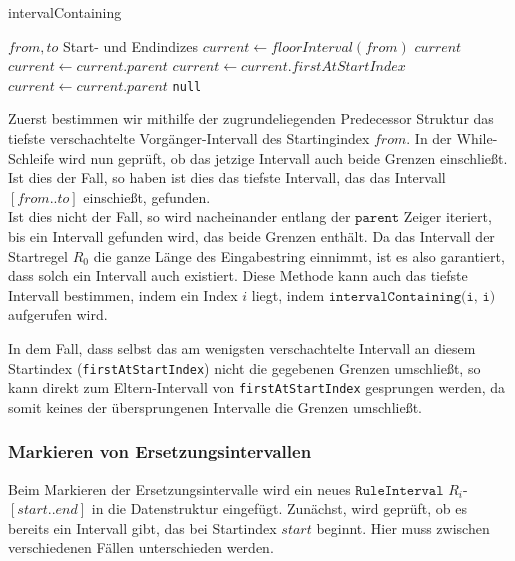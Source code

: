 \begin{algorithm}
	\caption{intervalContaining}
	\begin{algorithmic}
		\REQUIRE $from, to$ Start- und Endindizes
		\STATE $current \leftarrow floorInterval(from)$
				\RETURN $current$
			\ENDIF
                \STATE $current \leftarrow current.parent$
            \ELSE 
                \STATE $current \leftarrow current.firstAtStartIndex$
                    \STATE $current \leftarrow current.parent$
                \ENDIF
            \ENDIF
		\ENDWHILE
		\RETURN \texttt{null}
	\end{algorithmic}
\end{algorithm}

Zuerst bestimmen wir mithilfe der zugrundeliegenden Predecessor Struktur das tiefste verschachtelte Vorgänger-Intervall des Startingindex $from$. 
In der While-Schleife wird nun geprüft, ob das jetzige Intervall auch beide Grenzen einschließt. Ist dies der Fall, so haben ist dies das tiefste Intervall, das das Intervall $[from..to]$ einschießt, gefunden.\\
Ist dies nicht der Fall, so wird nacheinander entlang der $\texttt{parent}$ Zeiger iteriert, bis ein Intervall gefunden wird, das beide Grenzen enthält. Da das Intervall der Startregel $R_0$ die ganze Länge des Eingabestring einnimmt, ist es also garantiert, dass solch ein Intervall auch existiert. Diese Methode kann auch das tiefste Intervall bestimmen, indem ein Index $i$ liegt, indem $\texttt{intervalContaining(i, i)}$ aufgerufen wird.

In dem Fall, dass selbst das am wenigsten verschachtelte Intervall an diesem Startindex (\texttt{firstAtStartIndex}) nicht die gegebenen Grenzen umschließt, so kann direkt zum Eltern-Intervall von \texttt{firstAtStartIndex} gesprungen werden, da somit keines der übersprungenen Intervalle die Grenzen umschließt. 

\subsubsection{Markieren von Ersetzungsintervallen}

Beim Markieren der Ersetzungsintervalle wird ein neues $\texttt{RuleInterval}$ $R_i$-$[start..end]$ in die Datenstruktur eingefügt. 
Zunächst, wird geprüft, ob es bereits ein Intervall gibt, das bei Startindex $start$ beginnt.
Hier muss zwischen verschiedenen Fällen unterschieden werden.


